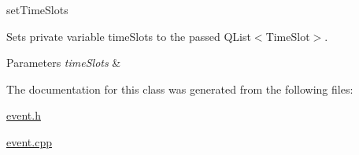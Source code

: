 set\+Time\+Slots 

Sets private variable time\+Slots to the passed Q\+List$<$\+Time\+Slot$>$. 
\begin{DoxyParams}{Parameters}
{\em time\+Slots} & \\
\hline
\end{DoxyParams}


The documentation for this class was generated from the following files\+:\begin{DoxyCompactItemize}
\item 
\hyperlink{event_8h}{event.\+h}\item 
\hyperlink{event_8cpp}{event.\+cpp}\end{DoxyCompactItemize}
